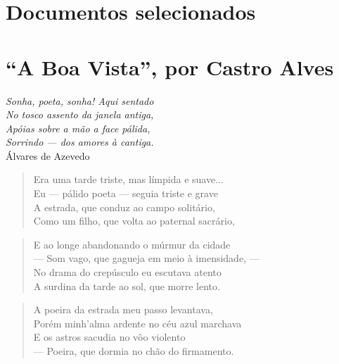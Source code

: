 \begin{anexosenv}


\chapter{Documentos selecionados}



\chapter{``A Boa Vista'', por Castro Alves}\label{cap:boavista}

\settowidth{\versewidth}{}

\begin{flushright}
\textit{Sonha, poeta, sonha! Aqui sentado \\
No tosco assento da janela antiga,\\
Apóias sobre a mão a face pálida,\\
Sorrindo — dos amores à cantiga.}\\
Álvares de Azevedo
\end{flushright}

\begin{verse}
Era uma tarde triste, mas límpida e suave... \\
Eu — pálido poeta — seguia triste e grave \\
A estrada, que conduz ao campo solitário, \\
Como um filho, que volta ao paternal sacrário, \\
\end{verse}

\begin{verse}
E ao longe abandonando o múrmur da cidade \\
— Som vago, que gagueja em meio à imensidade, — \\
No drama do crepúsculo eu escutava atento \\
A surdina da tarde ao sol, que morre lento. \\
\end{verse}

\begin{verse}
A poeira da estrada meu passo levantava, \\
Porém minh'alma ardente no céu azul marchava \\
E os astros sacudia no vôo violento \\
— Poeira, que dormia no chão do firmamento. \\
\end{verse}


\end{anexosenv}
